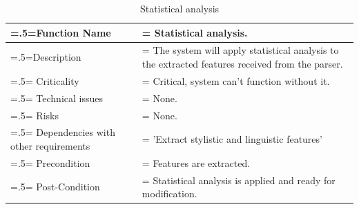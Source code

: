 \documentclass[12pt]{article}
\begin{document}
\begin{center}
    \begin{table}[H]
        \caption{Statistical analysis}
        \begin{tabularx}{\textwidth} {
                | >{\raggedright\arraybackslash\hsize=.5\hsize\linewidth=\hsize}X
                | >{\raggedright\arraybackslash\hsize=1.5\hsize\linewidth=\hsize}X |}
            \hline
            Function Name                        & Statistical analysis.                                                                          \\ \hline
            Description                          & The system will apply statistical analysis to the extracted features received from the parser. \\ \hline
            Criticality                          & Critical, system can't function without it.                                                    \\ \hline
            Technical issues                     & None.                                                                                          \\ \hline
            Risks                                & None.                                                                                          \\ \hline
            Dependencies with other requirements & 'Extract stylistic and linguistic features'                                                    \\ \hline
            Precondition                         & Features are extracted.                                                                        \\ \hline
            Post-Condition                       & Statistical analysis is applied and ready for modification.                                    \\ \hline
        \end{tabularx}
    \end{table}
\end{center}
\end{document}

